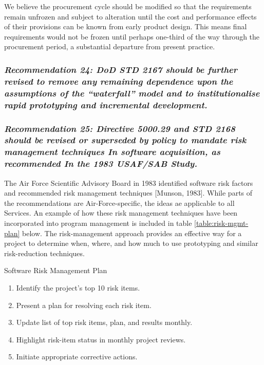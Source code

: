 \documentclass[12pt]{article}
\begin{document}
We believe the procurement cycle should be modified so that the requirements
remain unfrozen and subject to alteration until the cost and performance
effects of their provisions can be known from early product design. This means
final requirements would not be frozen until perhaps one-third of the way
through the procurement period, a substantial departure from present practice.

\subsubsection*{\textit{Recommendation 24: DoD STD 2167 should be further revised to remove
any remaining dependence upon the assumptions of the “waterfall” model and
to institutionalise rapid prototyping and incremental development.}}

\subsubsection*{\textit{Recommendation 25: Directive 5000.29 and STD 2168 should be revised
or superseded by policy to mandate risk management techniques In software
acquisition, as recommended In the 1983 USAF/SAB Study.}}

The Air Force Scientific Advisory Board in 1983 identified software risk
factors and recommended risk management techniques [Munson, 1983]. While parts
of the recommendations are Air-Force-specific, the ideas ae applicable to all
Services. An example of how these risk management techniques have been
incorporated into program management is included in table
\ref{table:risk-mgmt-plan} below. The risk-management approach provides an
effective way for a project to determine when, where, and how much to use
prototyping and similar risk-reduction techniques.

\begin{table}[hb]
    \caption{Software Risk Management Plan}
    \label{table:risk-mgmt-plan}
\begin{enumerate}
    \item Identify the project's top 10 risk items.
    \item Present a plan for resolving each risk item.
    \item Update list of top risk items, plan, and results monthly.
    \item Highlight risk-item status in monthly project reviews.
    \item Initiate appropriate corrective actions.
\end{enumerate}
\end{table}
\end{document}

